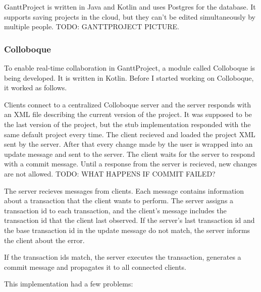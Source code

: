 \documentclass[a4paper, 11pt, oneside]{article}
\theoremstyle{definition}
\begin{document}
GanttProject is written in Java and Kotlin and uses Postgres for the database. It supports saving projects in the cloud, but they can't be edited simultaneously by multiple people. TODO: GANTTPROJECT PICTURE. 

\subsubsection{Colloboque}
To enable real-time collaboration in GanttProject, a module called Colloboque is being developed. It is written in Kotlin. Before I started working on Colloboque, it worked as follows.

Clients connect to a centralized Colloboque server and the server responds with an XML file describing the current version of the project. It was supposed to be the last version of the project, but the stub implementation responded with the same default project every time. The client recieved and loaded the project XML sent by the server. After that every change made by the user is wrapped into an update message and sent to the server. The client waits for the server to respond with a commit message. Until a response from the server is recieved, new changes are not allowed. TODO: WHAT HAPPENS IF COMMIT FAILED?

The server recieves messages from clients. Each message contains information about a transaction that the client wants to perform. The server assigns a transaction id to each transaction, and the client's message includes the transaction id that the client last observed. If the server's last transaction id and the base transaction id in the update message do not match, the server informs the client about the error.

If the transaction ids match, the server executes the transaction, generates a commit message and propagates it to all connected clients.

This implementation had a few problems:
\end{document}
